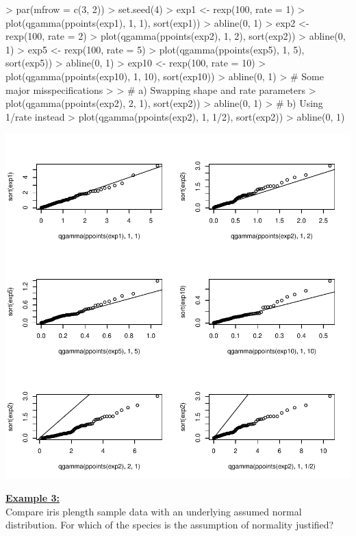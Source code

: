 \begin{Schunk}
\begin{Sinput}
> par(mfrow = c(3, 2))
> set.seed(4) 
> exp1 <- rexp(100, rate = 1)
> plot(qgamma(ppoints(exp1), 1, 1), sort(exp1))
> abline(0, 1)
> exp2 <- rexp(100, rate = 2)
> plot(qgamma(ppoints(exp2), 1, 2), sort(exp2))
> abline(0, 1)
> exp5 <- rexp(100, rate = 5)
> plot(qgamma(ppoints(exp5), 1, 5), sort(exp5))
> abline(0, 1)
> exp10 <- rexp(100, rate = 10)
> plot(qgamma(ppoints(exp10), 1, 10), sort(exp10))
> abline(0, 1)
> # Some major misspecifications
> 
> # a) Swapping shape and rate parameters
> plot(qgamma(ppoints(exp2), 2, 1), sort(exp2))
> abline(0, 1)
> # b) Using 1/rate instead
> plot(qgamma(ppoints(exp2), 1, 1/2), sort(exp2))
> abline(0, 1)
\end{Sinput}
\end{Schunk}
\includegraphics{lect_chapter5_v2-033}


\underline{\bf Example 3:} \\
Compare iris plength sample data with an underlying assumed normal distribution.
For which of the species is the assumption of normality justified?

